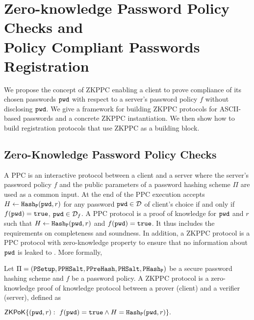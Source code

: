 \section[ZKPPC and Password Registration]{Zero-knowledge Password Policy Checks and\\ Policy Compliant Passwords Registration} \label{sec:zkppc}

We propose the concept of \ac{ZKPPC} enabling a client to prove compliance of its chosen passwords $\mathtt{pwd}$ with respect to a server's password policy $f$ without disclosing $\mathtt{pwd}$. 
We give a framework for building \ac{ZKPPC} protocols for \ac{ASCII}-based passwords and a concrete \ac{ZKPPC} instantiation. 
We then show how to build registration protocols that use \ac{ZKPPC} as a building block.

\subsection{Zero-Knowledge Password Policy Checks}
A \ac{PPC} is an interactive protocol between a client \Client and a server \Server where the server's password policy $f$ and the public parameters of a password hashing scheme $\Pi$ are used as a common input. 
At the end of the \ac{PPC} execution \Server accepts $H\gets \mathtt{Hash_P}(\mathtt{pwd},r)$ for any password $\mathtt{pwd}\in\mathcal{D}$ of client's choice if and only if $f(\mathtt{pwd})=\mathtt{true}$, \ie $\mathtt{pwd}\in\mathcal{D}_f$. 
A \ac{PPC} protocol is a proof of knowledge for $\mathtt{pwd}$ and $r$ such that $H\gets \mathtt{Hash_P}(\mathtt{pwd},r)$ and $f(\mathtt{pwd})=\mathtt{true}$. 
It thus includes the requirements on completeness and soundness. 
In addition, a \ac{ZKPPC} protocol is a \ac{PPC} protocol with zero-knowledge property to ensure that no information about $\mathtt{pwd}$ is leaked to \Server. 
More formally, %

\begin{definition}[ZKPPC]\label{def:pocopas}
Let $\Pi=(\mathtt{PSetup},\allowbreak\mathtt{PPHSalt},\allowbreak\mathtt{PPreHash},\mathtt{PHSalt},\allowbreak\mathtt{PHash_P})$ be a secure password hashing scheme and $f$ be a password policy. A \ac{ZKPPC} protocol is a zero-knowledge proof of knowledge protocol between a prover \Client (client) and a verifier \Server (server), defined as
\begin{center}$\mathsf{ZKPoK}\{(\mathtt{pwd},r):~f(\mathtt{pwd})=\mathtt{true} \wedge H=\mathtt{Hash_P}(\mathtt{pwd},r)\}.$\end{center}
\eod
\end{definition}

